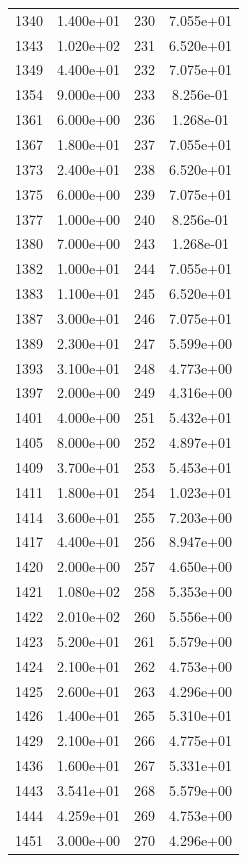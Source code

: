 \documentclass[12pt]{article}
\begin{document}
\begin{longtable}{@{}cccc@{}}
1340 & 1.400e+01 & 230 & 7.055e+01 \\
1343 & 1.020e+02 & 231 & 6.520e+01 \\
1349 & 4.400e+01 & 232 & 7.075e+01 \\
1354 & 9.000e+00 & 233 & 8.256e-01 \\
1361 & 6.000e+00 & 236 & 1.268e-01 \\
1367 & 1.800e+01 & 237 & 7.055e+01 \\
1373 & 2.400e+01 & 238 & 6.520e+01 \\
1375 & 6.000e+00 & 239 & 7.075e+01 \\
1377 & 1.000e+00 & 240 & 8.256e-01 \\
1380 & 7.000e+00 & 243 & 1.268e-01 \\
1382 & 1.000e+01 & 244 & 7.055e+01 \\
1383 & 1.100e+01 & 245 & 6.520e+01 \\
1387 & 3.000e+01 & 246 & 7.075e+01 \\
1389 & 2.300e+01 & 247 & 5.599e+00 \\
1393 & 3.100e+01 & 248 & 4.773e+00 \\
1397 & 2.000e+00 & 249 & 4.316e+00 \\
1401 & 4.000e+00 & 251 & 5.432e+01 \\
1405 & 8.000e+00 & 252 & 4.897e+01 \\
1409 & 3.700e+01 & 253 & 5.453e+01 \\
1411 & 1.800e+01 & 254 & 1.023e+01 \\
1414 & 3.600e+01 & 255 & 7.203e+00 \\
1417 & 4.400e+01 & 256 & 8.947e+00 \\
1420 & 2.000e+00 & 257 & 4.650e+00 \\
1421 & 1.080e+02 & 258 & 5.353e+00 \\
1422 & 2.010e+02 & 260 & 5.556e+00 \\
1423 & 5.200e+01 & 261 & 5.579e+00 \\
1424 & 2.100e+01 & 262 & 4.753e+00 \\
1425 & 2.600e+01 & 263 & 4.296e+00 \\
1426 & 1.400e+01 & 265 & 5.310e+01 \\
1429 & 2.100e+01 & 266 & 4.775e+01 \\
1436 & 1.600e+01 & 267 & 5.331e+01 \\
1443 & 3.541e+01 & 268 & 5.579e+00 \\
1444 & 4.259e+01 & 269 & 4.753e+00 \\
1451 & 3.000e+00 & 270 & 4.296e+00 \\

\end{longtable}
\end{document}
